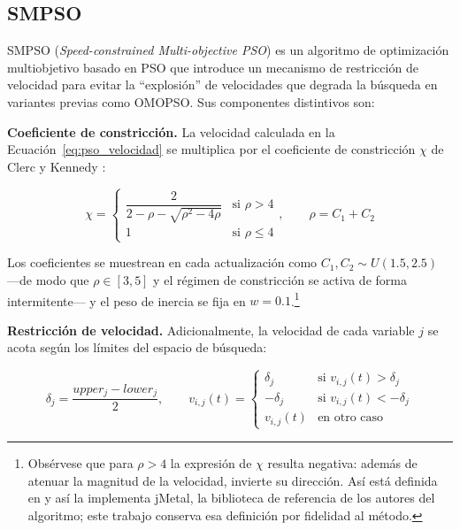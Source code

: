 \subsection{SMPSO}
\label{sec:smpso}

SMPSO (\textit{Speed-constrained Multi-objective PSO}) \citep{Nebro2009} es un algoritmo de optimización multiobjetivo basado en PSO que introduce un mecanismo de restricción de velocidad para evitar la ``explosión'' de velocidades que degrada la búsqueda en variantes previas como OMOPSO. Sus componentes distintivos son:

\textbf{Coeficiente de constricción.} La velocidad calculada en la Ecuación~\ref{eq:pso_velocidad} se multiplica por el coeficiente de constricción $\chi$ de Clerc y Kennedy \citep{Clerc2002}:

\begin{equation}
\chi = \begin{cases} \dfrac{2}{2 - \rho - \sqrt{\rho^2 - 4\rho}} & \text{si } \rho > 4 \\[3mm] 1 & \text{si } \rho \leq 4 \end{cases},
\qquad \rho = C_1 + C_2
\label{eq:constriccion}
\end{equation}

Los coeficientes se muestrean en cada actualización como $C_1, C_2 \sim U(1.5, 2.5)$ ---de modo que $\rho \in [3, 5]$ y el régimen de constricción se activa de forma intermitente--- y el peso de inercia se fija en $w = 0.1$.\footnote{Obsérvese que para $\rho > 4$ la expresión de $\chi$ resulta negativa: además de atenuar la magnitud de la velocidad, invierte su dirección. Así está definida en \citet{Nebro2009} y así la implementa jMetal, la biblioteca de referencia de los autores del algoritmo; este trabajo conserva esa definición por fidelidad al método.}

\textbf{Restricción de velocidad.} Adicionalmente, la velocidad de cada variable $j$ se acota según los límites del espacio de búsqueda:

\begin{equation}
\delta_j = \frac{upper_j - lower_j}{2}, \qquad
v_{i,j}(t) = \begin{cases} \delta_j & \text{si } v_{i,j}(t) > \delta_j \\ -\delta_j & \text{si } v_{i,j}(t) < -\delta_j \\ v_{i,j}(t) & \text{en otro caso} \end{cases}
\label{eq:delta}
\end{equation}

